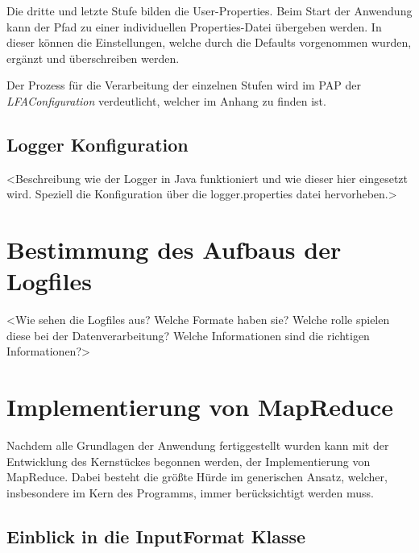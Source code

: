 Die dritte und letzte Stufe bilden die User-Properties. Beim Start der Anwendung kann der Pfad zu einer individuellen Properties-Datei übergeben werden. In dieser können die Einstellungen, welche durch die Defaults vorgenommen wurden, ergänzt und  überschreiben werden.

Der Prozess für die Verarbeitung der einzelnen Stufen wird im \ac{PAP} der \textit{LFAConfiguration} verdeutlicht, welcher im Anhang zu finden ist.


\subsection{Logger Konfiguration}
<Beschreibung wie der Logger in Java funktioniert und wie dieser hier eingesetzt wird. Speziell die Konfiguration über die logger.properties datei hervorheben.>


\section{Bestimmung des Aufbaus der Logfiles}
<Wie sehen die Logfiles aus? Welche Formate haben sie? Welche rolle spielen diese bei der Datenverarbeitung? Welche Informationen sind die richtigen Informationen?>

\section{Implementierung von MapReduce}
Nachdem alle Grundlagen der Anwendung fertiggestellt wurden kann mit der Entwicklung des Kernstückes begonnen werden, der Implementierung von MapReduce. Dabei besteht die größte Hürde im generischen Ansatz, welcher, insbesondere im Kern des Programms, immer berücksichtigt werden muss.



\subsection{Einblick in die InputFormat Klasse}


